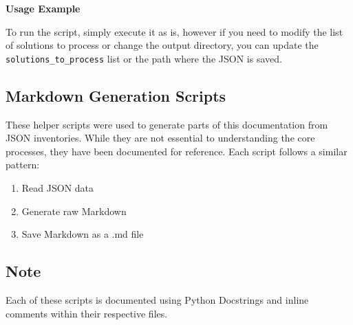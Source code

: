 \textbf{Usage Example}

To run the script, simply execute it as is, however if you need to modify the list of solutions to process or change the output directory, you can update the \\ \texttt{solutions\_to\_process} list or the path where the JSON is saved.

\subsection{Markdown Generation Scripts}

These helper scripts were used to generate parts of this documentation from JSON inventories. While they are not essential to understanding the core processes, they have been documented for reference. Each script follows a similar pattern:
\begin{enumerate}
	\item Read JSON data
	\item Generate raw Markdown
	\item Save Markdown as a .md file
\end{enumerate}

\subsection{Note}
Each of these scripts is documented using Python Docstrings and inline comments within their respective files.